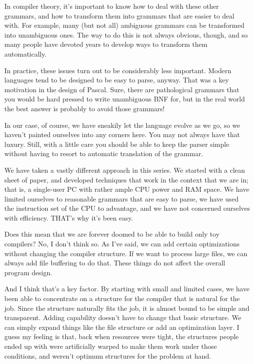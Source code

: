 In compiler theory, it's important  to know how to deal with these  other  grammars, and  how  to  transform  them  into grammars  that  are  easier to deal with. For example, many (but not all) ambiguous  grammars  can  be  transformed into unambiguous ones. The way to do this is not always obvious, though, and so many people  have  devoted  years  to develop ways to transform them automatically.

In practice, these  issues  turn out to be considerably less important. Modern languages tend  to be designed to be easy to parse, anyway. That  was a key motivation in the design of Pascal. Sure, there are pathological grammars that you would be hard pressed to write unambiguous BNF  for, but in the  real  world  the best answer is probably to avoid those grammars!

In  our  case, of course, we have sneakily let the language evolve  as  we  go, so we haven't painted ourselves into any corners here. You may not always have that luxury. Still, with a little  care  you  should  be able to keep the parser simple without having to resort to automatic  translation of the grammar.


We have taken  a  vastly  different  approach in this series. We started with a clean sheet  of  paper, and  developed techniques that work in the context that  we  are in; that is, a single-user PC  with  rather  ample CPU power and RAM space. We have limited ourselves to reasonable grammars that  are easy to parse, we have used the instruction set of the CPU to advantage, and we have not concerned ourselves with efficiency. THAT's why it's been easy.

Does this mean that we are forever doomed  to  be  able  to build only toy compilers?   No, I don't think so. As I've said, we can add  certain   optimizations   without   changing   the  compiler structure. If we want to process large files, we can  always add file  buffering  to do that. These  things  do  not  affect  the overall program design.

And I think  that's  a  key  factor. By starting with small and limited  cases, we  have been able to concentrate on a structure for  the  compiler  that is natural  for  the  job. Since  the structure naturally fits the job, it is almost bound to be simple and transparent. Adding  capability doesn't have to change that basic  structure. We  can  simply expand things like the  file structure or add an optimization layer. I guess  my  feeling  is that, back when resources were tight, the structures people ended up  with  were  artificially warped to make them work under those conditions, and weren't optimum  structures  for  the  problem at hand.

